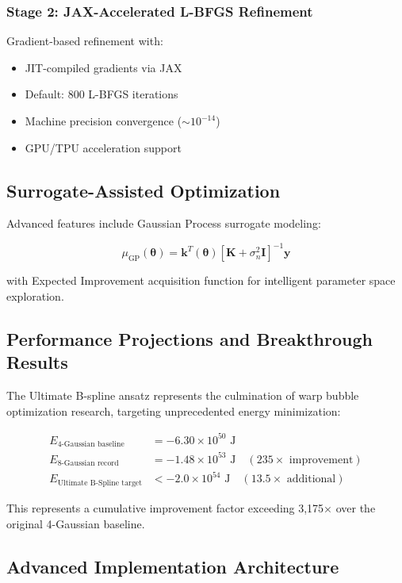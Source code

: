 \documentclass[12pt,a4paper]{article}
\begin{document}
\subsubsection{Stage 2: JAX-Accelerated L-BFGS Refinement}
Gradient-based refinement with:
\begin{itemize}
\item JIT-compiled gradients via JAX
\item Default: 800 L-BFGS iterations
\item Machine precision convergence ($\sim 10^{-14}$)
\item GPU/TPU acceleration support
\end{itemize}

\subsection{Surrogate-Assisted Optimization}

Advanced features include Gaussian Process surrogate modeling:

\begin{equation}
\mu_{\text{GP}}(\boldsymbol{\theta}) = \mathbf{k}^T(\boldsymbol{\theta}) \left[\mathbf{K} + \sigma_n^2 \mathbf{I}\right]^{-1} \mathbf{y}
\end{equation}

with Expected Improvement acquisition function for intelligent parameter space exploration.

\subsection{Performance Projections and Breakthrough Results}

The Ultimate B-spline ansatz represents the culmination of warp bubble optimization research, targeting unprecedented energy minimization:

\begin{align}
E_{\text{4-Gaussian baseline}} &= -6.30 \times 10^{50} \text{ J} \\
E_{\text{8-Gaussian record}} &= -1.48 \times 10^{53} \text{ J} \quad (235\times \text{ improvement}) \\
E_{\text{Ultimate B-Spline target}} &< -2.0 \times 10^{54} \text{ J} \quad (13.5\times \text{ additional})
\end{align}

This represents a cumulative improvement factor exceeding 3,175× over the original 4-Gaussian baseline.

\subsection{Advanced Implementation Architecture}
\end{document}
